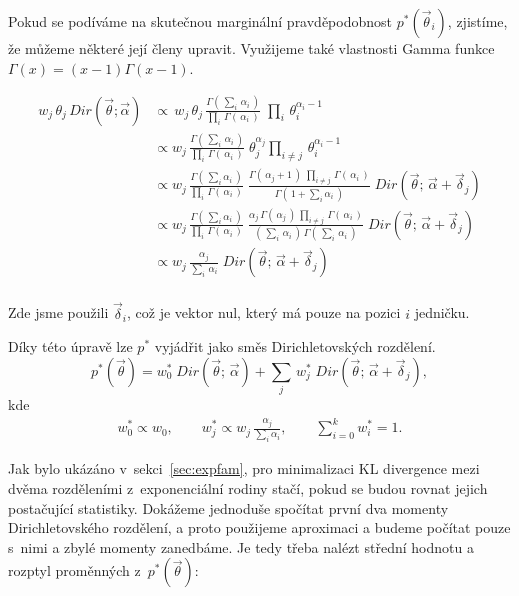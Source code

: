 Pokud se podíváme na skutečnou marginální pravděpodobnost
$p^*(\vec{\theta}_i)$, zjistíme, že můžeme některé její členy upravit.
Využijeme také vlastnosti Gamma funkce $\Gamma(x) = (x-1) \Gamma(x-1)$.

\begin{align}
w_j \, \theta_j \, Dir(\vec{\theta}; \vec{\alpha}) &\propto \,
    w_j \, \theta_j \, \frac{\Gamma (\, \sum_i \, \alpha_{i} \,)}{\prod_i \, \Gamma(\,\alpha_i\,)}\;
    \prod_i \, \theta_{i}^{\alpha_{i} - 1}
\label{eq:4}
\\
&\propto w_j \, \frac{\Gamma (\,\sum_i \, \alpha_{i}\,)} {\prod_i \,
    \Gamma(\,\alpha_{i}\,)} \; \theta_j^{\alpha_j} \prod_{i \ne j} \,
    \theta_{i}^{\alpha_{i} - 1} \\
&\propto w_j \,
    \frac{\Gamma (\,\sum_i \alpha_{i}\,)}
         {\prod_i \, \Gamma(\, \alpha_{i} \,)} \;
    \frac{\Gamma(\, \alpha_{j} + 1 \,) \; \prod_{i \ne j} \, \Gamma(\,\alpha_i\,)}
         {\Gamma (\,1 + \sum_i \alpha_i\,)} \;
    Dir(\vec\theta; \, \vec{\alpha} + \vec{\delta}_j) \\
&\propto w_j \,
    \frac{\Gamma (\,\sum_i \alpha_{i}\,)}
         {\prod_i \, \Gamma(\, \alpha_{i}\,)} \;
    \frac{\alpha_j \, \Gamma(\,\alpha_j\,) \, \prod_{i \ne j} \, \Gamma(\,\alpha_i\,)}
         {(\,\sum_i \, \alpha_i\,) \, \Gamma (\,\sum_i \,\alpha_i\,)}\;
    Dir(\vec\theta; \,\vec{\alpha} + \vec{\delta}_j) \\
&\propto w_j \,
    \frac{\alpha_j}
         {\sum_i \, \alpha_i} \;
    Dir(\vec\theta; \,\vec{\alpha} + \vec{\delta}_j) \\
\end{align}

Zde jsme použili $\vec{\delta}_i$, což je vektor nul, který má pouze na pozici $i$ jedničku.

Díky této úpravě lze $p^*$ vyjádřit jako směs Dirichletovských rozdělení.
\begin{equation}
p^*(\vec{\theta}) =
    w_0^* \; Dir(\vec{\theta};\, \vec{\alpha}) +
    \sum_j \, w^*_j \;
        Dir(\vec{\theta};\, \vec{\alpha} + \vec{\delta}_j),
\label{eq:marginaltheta}
\end{equation}
kde
\begin{align}
    w^*_0 \propto w_0, \quad \quad
    w^*_j \propto w_j \, \frac{\alpha_j}{\sum_i \alpha_i}, \quad \quad
    \sum_{i=0}^k w_i^* = 1.
\end{align}

Jak bylo ukázáno v~sekci~\ref{sec:expfam}, pro minimalizaci KL divergence mezi dvěma rozděleními z~exponenciální rodiny
stačí, pokud se budou rovnat jejich postačující statistiky. Dokážeme jednoduše
spočítat první dva momenty Dirichletovského rozdělení, a proto použijeme
aproximaci a budeme počítat pouze s~nimi a zbylé momenty zanedbáme.
Je tedy třeba nalézt střední hodnotu a rozptyl proměnných z~$p^*(\vec\theta)$:

